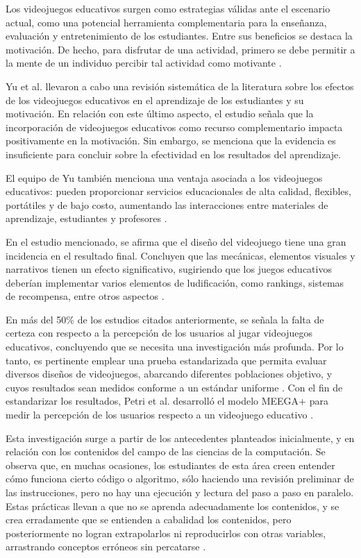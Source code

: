 Los videojuegos educativos surgen como estrategias válidas ante el escenario actual, como una potencial herramienta complementaria para la enseñanza, evaluación y entretenimiento de los estudiantes. Entre sus beneficios se destaca la motivación. De hecho, para disfrutar de una actividad, primero se debe permitir a la mente de un individuo percibir tal actividad como motivante \cite{Bisson1996FunInLEarningPedagogicalRole}.

Yu et al. \cite{Yu2020TheEffectsOfEducationGames} llevaron a cabo una revisión sistemática de la literatura sobre los efectos de los videojuegos educativos en el aprendizaje de los estudiantes y su motivación. En relación con este último aspecto, el estudio señala que la incorporación de videojuegos educativos como recurso complementario impacta positivamente en la motivación. Sin embargo, se menciona que la evidencia es insuficiente para concluir sobre la efectividad en los resultados del aprendizaje.

El equipo de Yu también menciona una ventaja asociada a los videojuegos educativos: pueden proporcionar servicios educacionales de alta calidad, flexibles, portátiles y de bajo costo, aumentando las interacciones entre materiales de aprendizaje, estudiantes y profesores \cite{Yu2020TheEffectsOfEducationGames}.

En el estudio mencionado, se afirma que el diseño del videojuego tiene una gran incidencia en el resultado final. Concluyen que las mecánicas, elementos visuales y narrativos tienen un efecto significativo, sugiriendo que los juegos educativos deberían implementar varios elementos de ludificación, como rankings, sistemas de recompensa, entre otros aspectos \cite{Yu2020TheEffectsOfEducationGames}.

En más del 50\% de los estudios citados anteriormente, se señala la falta de certeza con respecto a la percepción de los usuarios al jugar videojuegos educativos, concluyendo que se necesita una investigación más profunda. Por lo tanto, es pertinente emplear una prueba estandarizada que permita evaluar diversos diseños de videojuegos, abarcando diferentes poblaciones objetivo, y cuyos resultados sean medidos conforme a un estándar uniforme \cite{Yu2020TheEffectsOfEducationGames}. Con el fin de estandarizar los resultados, Petri et al. desarrolló el modelo MEEGA+ para medir la percepción de los usuarios respecto a un videojuego educativo \cite{meegaplus}.


Esta investigación surge a partir de los antecedentes planteados inicialmente, y en relación con los contenidos del campo de las ciencias de la computación. Se observa que, en muchas ocasiones, los estudiantes de esta área creen entender cómo funciona cierto código o algoritmo, sólo haciendo una revisión preliminar de las instrucciones, pero no hay una ejecución y lectura del paso a paso en paralelo. Estas prácticas llevan a que no se aprenda adecuadamente los contenidos, y se crea erradamente que se entienden a cabalidad los contenidos, pero posteriormente no logran extrapolarlos ni reproducirlos con otras variables, arrastrando conceptos erróneos sin percatarse \cite{IdentifyingStudentDifficultiesDataStructures}.

